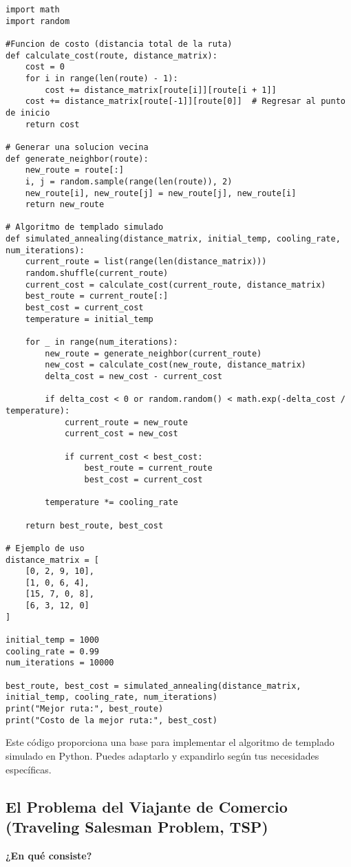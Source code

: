 \documentclass{article}
\begin{document}
\begin{lstlisting}
import math
import random

#Funcion de costo (distancia total de la ruta)
def calculate_cost(route, distance_matrix):
    cost = 0
    for i in range(len(route) - 1):
        cost += distance_matrix[route[i]][route[i + 1]]
    cost += distance_matrix[route[-1]][route[0]]  # Regresar al punto de inicio
    return cost

# Generar una solucion vecina
def generate_neighbor(route):
    new_route = route[:]
    i, j = random.sample(range(len(route)), 2)
    new_route[i], new_route[j] = new_route[j], new_route[i]
    return new_route

# Algoritmo de templado simulado
def simulated_annealing(distance_matrix, initial_temp, cooling_rate, num_iterations):
    current_route = list(range(len(distance_matrix)))
    random.shuffle(current_route)
    current_cost = calculate_cost(current_route, distance_matrix)
    best_route = current_route[:]
    best_cost = current_cost
    temperature = initial_temp

    for _ in range(num_iterations):
        new_route = generate_neighbor(current_route)
        new_cost = calculate_cost(new_route, distance_matrix)
        delta_cost = new_cost - current_cost

        if delta_cost < 0 or random.random() < math.exp(-delta_cost / temperature):
            current_route = new_route
            current_cost = new_cost

            if current_cost < best_cost:
                best_route = current_route
                best_cost = current_cost

        temperature *= cooling_rate

    return best_route, best_cost

# Ejemplo de uso
distance_matrix = [
    [0, 2, 9, 10],
    [1, 0, 6, 4],
    [15, 7, 0, 8],
    [6, 3, 12, 0]
]

initial_temp = 1000
cooling_rate = 0.99
num_iterations = 10000

best_route, best_cost = simulated_annealing(distance_matrix, initial_temp, cooling_rate, num_iterations)
print("Mejor ruta:", best_route)
print("Costo de la mejor ruta:", best_cost)
\end{lstlisting}

Este código proporciona una base para implementar el algoritmo de templado simulado en Python. Puedes adaptarlo y expandirlo según tus necesidades específicas.
\subsection{El Problema del Viajante de Comercio (Traveling Salesman Problem, TSP)}
\textbf{¿En qué consiste?}
\end{document}

